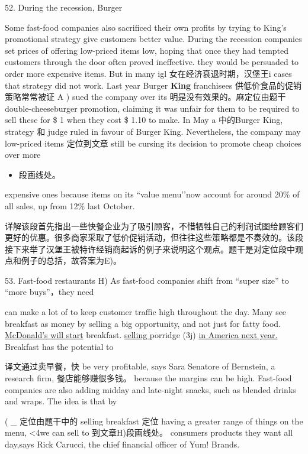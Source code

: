 \documentclass[UTF8,11pt]{ctexart}
\begin{document}
52. During the recession, Burger


Some fast-food companies also sacrificed their own profits by trying to King’s promotional strategy give customers better value. During the recession companies set prices of offering low-priced items low, hoping that once they had tempted customers through the door often proved ineffective. they would be persuaded to order more expensive items. But in many igl 女在经济衰退时期，汉堡王i cases that strategy did not work. Last year Burger\textbf{ King} franchisees 供低价食品的促销策略常常被证 A ) sued the company over its 明是没有效果的。麻定位由题干 double-cheeseburger promotion, claiming it was unfair for them to be required to sell these for \$ 1 when they cost \$ 1.10 to make. In May a 中的Burger King, strategy 和 judge ruled in favour of Burger King. Nevertheless, the company may low-priced items 定位到文章 still be cursing its decision to promote cheap choices over more


\begin{itemize}[leftmargin=2em,itemsep=.2em,topsep=.4em]\item[E.] 段画线处。
\end{itemize}

expensive ones because items on its “value menu’’now account for around 20\% of all sales, up from 12\% last October.


详解该段首先指出一些快餐企业为了吸引顾客，不惜牺牲自己的利润试图给顾客们更好的优惠。很多商家采取了低价促销活动，但往往这些策略都是不奏效的。该段接下来举了汉堡王被特许经销商起诉的例子来说明这个观点。题干是对定位段中观点和例子的总括，故答案为E)。


53. Fast-food restaurants H) As fast-food companies shift from “super size” to “more buys”，they need


can make a lot of to keep customer traffic high throughout the day. Many see breakfast as money by selling a big opportunity, and not just for fatty food. \uline{McDonald’s will start} breakfast. \uline{selling }porridge (3j) \uline{in America next year.} Breakfast has the potential to


译文通过卖早餐，快 be very profitable, says Sara Senatore of Bernstein, a research firm, 餐店能够赚很多钱。 because the margins can be high. Fast-food companies are also adding midday and late-night snacks, such as blended drinks and wraps. The idea is that by


( \_ 定位由题干中的 selling breakfast 定位 having a greater range of things on the menu, <4we can sell to 到文章H)段画线处。 consumers products they want all day,says Rick Carucci, the chief financial officer of Yum! Brands.
\end{document}
